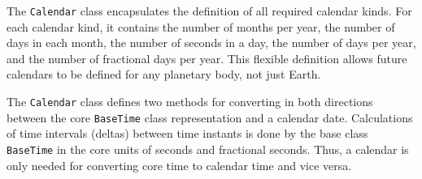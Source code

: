 
The {\tt Calendar} class encapsulates the definition of all required
calendar kinds. For each calendar kind, it contains the number of months
per year, the number of days in each month, the number of seconds in a day,
the number of days per year, and the number of fractional days per year.
This flexible definition allows future calendars to be defined for any
planetary body, not just Earth.

The {\tt Calendar} class defines two methods for converting in both
directions between the core {\tt BaseTime} class representation and a
calendar date.  Calculations of time intervals (deltas) between
time instants is done by the base class {\tt BaseTime} in the core units
of seconds and fractional seconds.  Thus,  a calendar is only needed for
converting core time to calendar time and vice versa.

